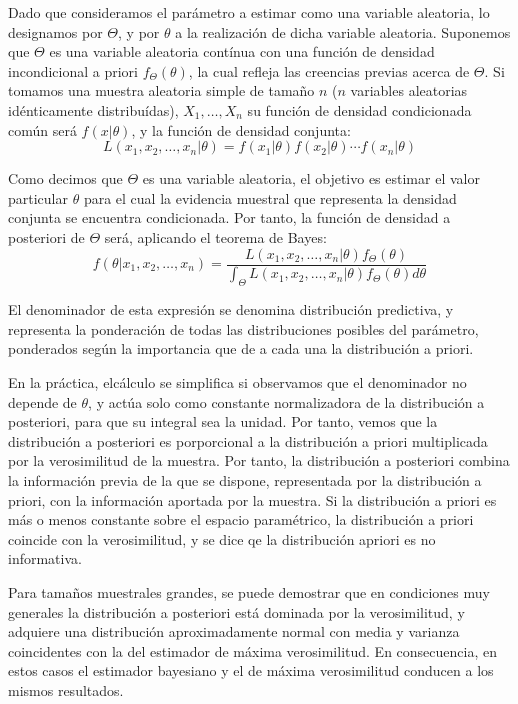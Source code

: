 Dado que consideramos el par\'ametro a estimar como una variable aleatoria, lo designamos por $\Theta$, y por $\theta$ a la realizaci\'on de dicha variable aleatoria. Suponemos que $\Theta$ es una variable aleatoria cont\'inua con una funci\'on de densidad incondicional a priori $f_{\Theta}(\theta)$, la cual refleja las creencias previas acerca de $\Theta$. Si tomamos una muestra aleatoria simple de tama\~no $n$ ($n$ variables aleatorias id\'enticamente distribu\'idas), $X_1,\ldots,X_n$ su funci\'on de densidad condicionada com\'un ser\'a $f(x|\theta)$, y la funci\'on de densidad conjunta:
\begin{equation*}
L(x_1,x_2,\ldots,x_n|\theta)=f(x_1|\theta)f(x_2|\theta)\cdots f(x_n|\theta)
\end{equation*}

Como decimos que $\Theta$ es una variable aleatoria, el objetivo es estimar el valor particular $\theta$ para el cual la evidencia muestral que representa la densidad conjunta se encuentra condicionada. Por tanto, la funci\'on de densidad a posteriori de $\Theta$ ser\'a, aplicando el teorema de Bayes:
\begin{equation*}
f(\theta|x_1,x_2,\ldots,x_n)=\dfrac{L(x_1,x_2,\ldots,x_n|\theta)f_{\Theta}(\theta)}{\int_{\Theta}L(x_1,x_2,\ldots,x_n|\theta)f_{\Theta}(\theta)d\theta}
\end{equation*}

El denominador de esta expresi\'on se denomina distribuci\'on predictiva, y representa la ponderaci\'on de todas las distribuciones posibles del par\'ametro, ponderados seg\'un la importancia que de a cada una la distribuci\'on a priori.

En la pr\'actica, elc\'alculo se simplifica si observamos que el denominador no depende de $\theta$, y act\'ua solo como constante normalizadora de la distribuci\'on a posteriori, para que su integral sea la unidad. Por tanto, vemos que la distribuci\'on a posteriori es porporcional a la distribuci\'on a priori multiplicada por la verosimilitud de la muestra. Por tanto, la distribuci\'on a posteriori combina la informaci\'on previa de la que se dispone, representada por la distribuci\'on a priori, con la informaci\'on aportada por la muestra. Si la distribuci\'on a priori es m\'as o menos constante sobre el espacio param\'etrico, la distribuci\'on a priori coincide con la verosimilitud, y se dice qe la distribuci\'on apriori es no informativa.

Para tama\~nos muestrales grandes, se puede demostrar que en condiciones muy generales la distribuci\'on a posteriori est\'a dominada por la verosimilitud, y adquiere una distribuci\'on aproximadamente normal con media y varianza coincidentes con la del estimador de m\'axima verosimilitud. En consecuencia, en estos casos el estimador bayesiano y el de m\'axima verosimilitud conducen a los mismos resultados.

